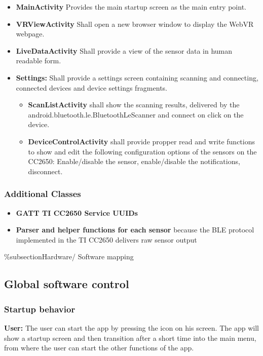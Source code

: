\begin{itemize}
  \item \textbf{MainActivity} Provides the main startup screen as the main entry point.
  \item \textbf{VRViewActivity} Shall open a new browser window to display the WebVR webpage.
  \item \textbf{LiveDataActivity} Shall provide a view of the sensor data in human readable form.
  \item \textbf{Settings:} Shall provide a settings screen containing scanning and connecting, connected devices and device settings fragments.
  \begin{itemize}
    \item \textbf{ScanListActivity} shall show the scanning results, delivered by the android.bluetooth.le.BluetoothLeScanner and connect on click on the device.
    \item \textbf{DeviceControlActivity} shall provide propper read and write functions to show and edit the following configuration options of the sensors on the CC2650: Enable/disable the sensor, enable/disable the notifications, disconnect.
  \end{itemize}
\end{itemize}

\subsubsection{Additional Classes}
\begin{itemize}
  \item \textbf{GATT TI CC2650 Service UUIDs}
  \item \textbf{Parser and helper functions for each sensor} because the BLE protocol implemented in the TI CC2650 delivers raw sensor output
\end{itemize}

\%subsection{Hardware/ Software mapping}


\subsection{Global software control}
\subsubsection{Startup behavior}
\textbf{User:} The user can start the app by pressing the icon on his screen.
The app will show a startup screen and then transition after a short time into the main menu, from where the user can start the other functions of the app.

